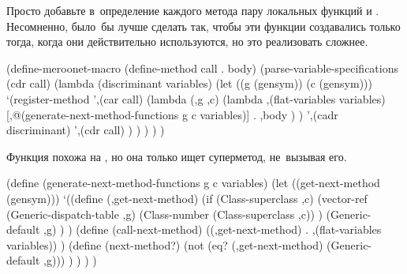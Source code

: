 
Просто добавьте в~определение каждого метода пару локальных функций
 и . Несомненно, было~бы лучше сделать
так, чтобы эти функции создавались только тогда, когда они действительно
используются, но это реализовать сложнее.

\begin{code:lisp}
(define-meroonet-macro (define-method call . body)
  (parse-variable-specifications
   (cdr call)
   (lambda (discriminant variables)
     (let ((g (gensym)) (c (gensym)))
       `(register-method
         ',(car call)
         (lambda (,g ,c)
           (lambda ,(flat-variables variables)
             [,@(generate-next-method-functions g c variables)]
             . ,body ) )
         ',(cadr discriminant)
         ',(cdr call) ) ) ) ) )
\end{code:lisp}

Функция  похожа на , но она только ищет
суперметод, не~вызывая его.

\begin{code:lisp}
(define (generate-next-method-functions g c variables)
  (let ((get-next-method (gensym)))
    `((define (,get-next-method)
        (if (Class-superclass ,c)
            (vector-ref (Generic-dispatch-table ,g)
                        (Class-number (Class-superclass ,c)) )
            (Generic-default ,g) ) )
      (define (call-next-method)
        ((,get-next-method) . ,(flat-variables variables)) )
      (define (next-method?)
        (not (eq? (,get-next-method) (Generic-default ,g))) ) ) ) )
\end{code:lisp}
